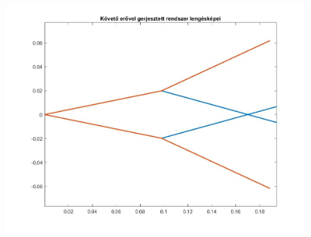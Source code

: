 \documentclass[12pt,twoside]{article}
\begin{document}
\begin{figure}[H]
\center
\includegraphics[scale=0.4]{lengésképek/koveto_ero_lengeskep.jpg}
\end{figure}
\end{document}
